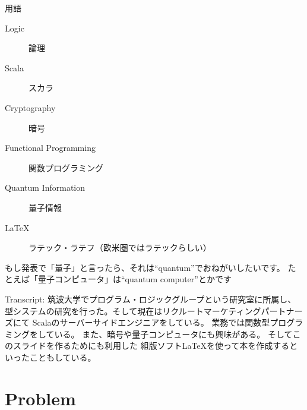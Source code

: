\begin{frame}
  \begin{notes}
    \item 用語
    \begin{description}
      \item[Logic] 論理
      \item[Scala] スカラ
      \item[Cryptography] 暗号
      \item[Functional Programming] 関数プログラミング
      \item[Quantum Information] 量子情報
      \item[\LaTeX] ラテック・ラテフ（欧米圏ではラテックらしい）
    \end{description}

    \item もし発表で「量子」と言ったら、それは``quantum''でおねがいしたいです。
    たとえば「量子コンピュータ」は``quantum computer''とかです

    \item Transcript:
    筑波大学でプログラム・ロジックグループという研究室に所属し、
    型システムの研究を行った。そして現在はリクルートマーケティングパートナーズにて
    Scalaのサーバーサイドエンジニアをしている。
    業務では関数型プログラミングをしている。
    また、暗号や量子コンピュータにも興味がある。
    そしてこのスライドを作るためにも利用した
    組版ソフト\LaTeX を使って本を作成するといったこともしている。
  \end{notes}
\end{frame}

\section{Problem}

